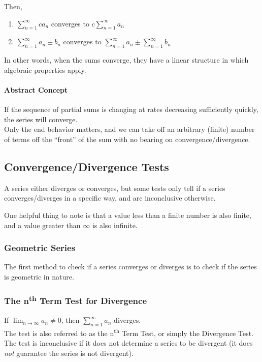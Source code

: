 \documentclass{article}
\begin{document}
Then,
\begin{enumerate}
    \item $\sum_{n=1}^{\infty} ca_n$ converges to $c\sum_{n=1}^{\infty} a_n$
    \item $\sum_{n=1}^{\infty} a_n \pm b_n$ converges to $\sum_{n=1}^{\infty} a_n \pm \sum_{n=1}^{\infty} b_n$
\end{enumerate}

In other words, when the sums converge, they have a linear structure in which algebraic properties apply.

\paragraph{Abstract Concept} If the sequence of partial sums is changing at rates decreasing sufficiently quickly, the series will converge.\\
Only the end behavior matters, and we can take off an arbitrary (finite) number of terms off the ``front'' of the sum with no bearing on convergence/divergence.

\subsection{Convergence/Divergence Tests}
A series either diverges or converges, but some tests only tell if a series converges/diverges in a specific way, and are inconclusive otherwise.

One helpful thing to note is that a value less than a finite number is also finite, and a value greater than $\infty$ is also infinite.

\subsubsection{Geometric Series} The first method to check if a series converges or diverges is to check if the series is geometric in nature.

\subsubsection{\texorpdfstring{The n\textsuperscript{th} Term Test for Divergence}{The Nth Term Test}} If $\lim_{n \to \infty} a_n \ne 0$, then $\sum_{n=1}^{\infty} a_n$ diverges.\\
The test is also referred to as the n\textsuperscript{th} Term Test, or simply the Divergence Test.\\
The test is inconclusive if it does not determine a series to be divergent (it does \emph{not} guarantee the series is not divergent).
\end{document}
